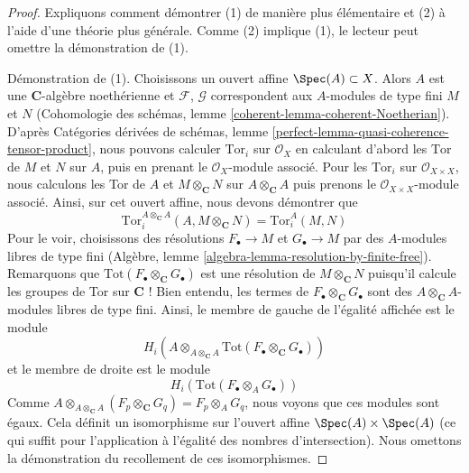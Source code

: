 \begin{proof}
Expliquons comment démontrer (1) de manière plus élémentaire et (2) à l'aide
d'une théorie plus générale. Comme (2) implique (1), le lecteur peut omettre la démonstration
de (1).

\medskip\noindent
Démonstration de (1). Choisissons un ouvert affine $\Spec(A) \subset X$.
Alors $A$ est une $\mathbf{C}$-algèbre noethérienne et
$\mathcal{F}$, $\mathcal{G}$ correspondent aux $A$-modules de type fini
$M$ et $N$ (Cohomologie des schémas, lemme
\ref{coherent-lemma-coherent-Noetherian}).
D'après Catégories dérivées de schémas, lemme
\ref{perfect-lemma-quasi-coherence-tensor-product}, nous pouvons
calculer $\text{Tor}_i$ sur $\mathcal{O}_X$
en calculant d'abord les $\text{Tor}$
de $M$ et $N$ sur $A$, puis en prenant le $\mathcal{O}_X$-module associé.
Pour les $\text{Tor}_i$ sur $\mathcal{O}_{X \times X}$, nous calculons
les Tor de $A$ et $M \otimes_\mathbf{C} N$ sur $A \otimes_\mathbf{C} A$
puis prenons le $\mathcal{O}_{X \times X}$-module associé.
Ainsi, sur cet ouvert affine, nous devons démontrer que
$$
\text{Tor}_i^{A \otimes_\mathbf{C} A}(A, M \otimes_\mathbf{C} N) =
\text{Tor}_i^A(M, N)
$$
Pour le voir, choisissons des résolutions $F_\bullet \to M$ et $G_\bullet \to M$
par des $A$-modules libres de type fini
(Algèbre, lemme \ref{algebra-lemma-resolution-by-finite-free}).
Remarquons que $\text{Tot}(F_\bullet \otimes_\mathbf{C} G_\bullet)$
est une résolution de $M \otimes_\mathbf{C} N$ puisqu'il calcule les
groupes de Tor sur $\mathbf{C}$ ! Bien entendu, les termes de
$F_\bullet \otimes_\mathbf{C} G_\bullet$ sont des
$A \otimes_\mathbf{C} A$-modules libres de type fini. Ainsi, le membre de gauche
de l'égalité affichée est le module
$$
H_i(A \otimes_{A \otimes_\mathbf{C} A}
\text{Tot}(F_\bullet \otimes_\mathbf{C} G_\bullet))
$$
et le membre de droite est le module
$$
H_i(\text{Tot}(F_\bullet \otimes_A G_\bullet))
$$
Comme $A \otimes_{A \otimes_\mathbf{C} A} (F_p \otimes_\mathbf{C} G_q)
= F_p \otimes_A G_q$, nous voyons que ces modules sont égaux.
Cela définit un isomorphisme sur l'ouvert affine $\Spec(A) \times \Spec(A)$
(ce qui suffit pour l'application à l'égalité des nombres d'intersection).
Nous omettons la démonstration du recollement de ces isomorphismes.


\end{proof}
